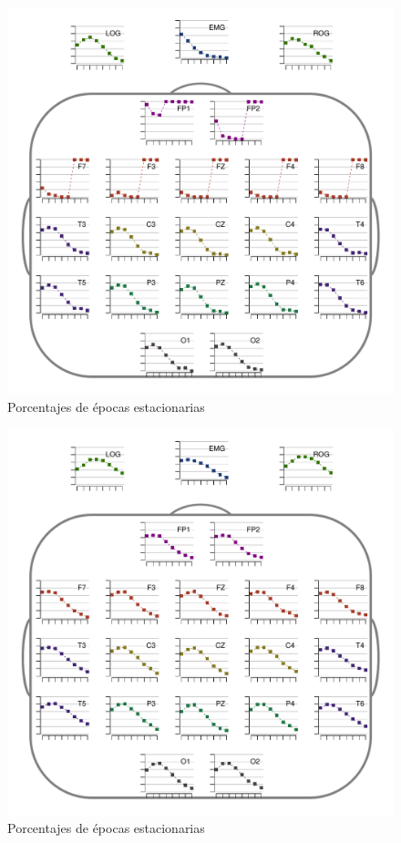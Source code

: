 
\begin{figure}
\centering
\includegraphics[width=.9\linewidth]{./img_resultados/FGHSUE_cabeza_epocas_.pdf}
\caption{Porcentajes de épocas estacionarias}
\end{figure}

\begin{figure}
\centering
\includegraphics[width=.9\linewidth]{./img_resultados/MGNA5SUE_cabeza_epocas_.pdf}
\caption{Porcentajes de épocas estacionarias}
\end{figure}

